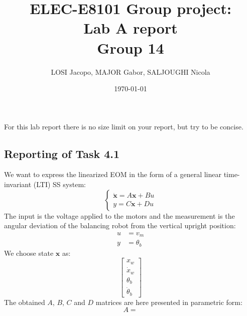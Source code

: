 \documentclass[11pt]{article}
\title{\Huge ELEC-E8101 Group project: \\ Lab A report \\ Group 14}
\date{\today}
\author{LOSI Jacopo, MAJOR Gabor, SALJOUGHI Nicola }
\begin{document}
\maketitle

\begin{instructions}
For this lab report there is no size limit on your report, but try to be concise.	
\end{instructions}



\subsection*{Reporting of Task 4.1}

We want to express the linearized EOM in the form of a general linear time-invariant (LTI) SS system:
\begin{equation*}
\begin{cases}
	\dot{\mathbf{x}} = A\mathbf{x} + Bu\\
	y = C\mathbf{x} + Du
\end{cases}
\end{equation*}
The input is the voltage applied to the motors and the measurement is the angular deviation of the balancing robot from the vertical upright position:
\begin{align*}
	u &= v_m \\
	y &= \theta_b
\end{align*}
We choose state $\mathbf{x}$ as:
\[
\begin{bmatrix}
	x_w\\
	\dot x_w\\
	\theta_b\\
	\dot \theta_b
\end{bmatrix}
\]
The obtained $A$, $B$, $C$ and $D$ matrices are here presented in parametric form:
$$A =$$

\newcommand\scalemath[2]{\scalebox{#1}{\mbox{\ensuremath{\displaystyle #2}}}}
\end{document}
